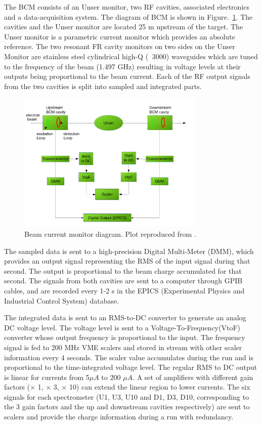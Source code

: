 The BCM consists of an Unser monitor, two RF cavities, associated electronics and a data-acquisition system.
The diagram of BCM is shown in Figure.~\ref{fig:BCM_diagram}.
The cavities and the Unser monitor are located 25 m upstream of the target.
The Unser monitor is a parametric current monitor which provides an absolute reference.  
The two resonant FR cavity monitors on two sides on the Unser Monitor are stainless steel
cylindrical high-Q ($~$ 3000) waveguides which are tuned to the frequency of the beam (1.497 GHz)
resulting in voltage levels at their outputs being proportional to the beam current.
Each of the RF output signals from the two cavities is split into sampled and integrated parts.

\begin{figure}[tb!]
\centering
\includegraphics[width=0.8\textwidth]{figs/BCM_diagram.pdf}
\caption[BCM diagram]{Beam current monitor diagram. Plot reproduced from \cite{Alcorn2004}.   \label{fig:BCM_diagram}}
\end{figure}


The sampled data is sent to a high-precision Digital Multi-Meter (DMM),
which provides an output signal representing the RMS of the input signal
during that second. The output is proportional to the beam charge accumulated
for that second. The signals from both cavities are sent to a computer
through GPIB cables, and are recorded every 1-2 s in the EPICS 
(Experimental Physics and Industrial Control System) database.

The integrated data is sent to an RMS-to-DC converter to generate
an analog DC voltage level. The voltage level is sent to 
a Voltage-To-Frequency(VtoF) converter whose output frequency is
proportional to the input.
The frequency signal is fed to 200 MHz VME scalers and stored in
stream with other scaler information every 4 seconds.
The scaler value accumulates during the run and is proportional
to the time-integrated voltage level.
The regular RMS to DC output is linear for currents from 5$\mu A$ to
200 $\mu A$. A set of amplifiers with different gain factors ($\times$ 1,
$\times$ 3, $\times$ 10) can extend the linear region to lower currents.
The six signals for each spectrometer (U1, U3, U10 and D1, D3, D10, corresponding to the 3 gain factors and the up and
downstream cavities respectively) are sent to scalers and provide
the charge information during a run with redundancy.


